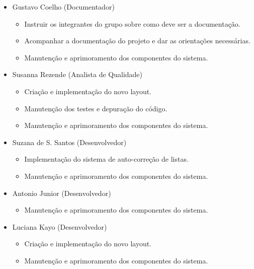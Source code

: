 \documentclass[12pt,letterpaper]{article}
\begin{document}
\begin{itemize}
\item {}Gustavo Coelho (Documentador)\\
\vspace{-0.5cm}
\begin{itemize}
\item{}Instruir os integrantes do grupo sobre como deve ser a documentação.\\
\item{}Acompanhar a documentação do projeto e dar as orientações necessárias.\\
\item{}Manutenção e aprimoramento dos componentes do sistema.
\end{itemize}
\vspace{0.5cm}

\item {}Susanna Rezende (Analista de Qualidade)\\
\vspace{-0.5cm}
\begin{itemize}
\item{}Criação e implementação do novo layout.\\
\item{}Manutenção dos testes e depuração do código.\\
\item{}Manutenção e aprimoramento dos componentes do sistema.
\end{itemize}
\vspace{0.5cm}

\item {}Suzana de S. Santos (Desenvolvedor)\\
\vspace{-0.5cm}
\begin{itemize}
\item{}Implementação do sistema de auto-correção de listas.\\
\item{}Manutenção e aprimoramento dos componentes do sistema.
\end{itemize}
\vspace{0.5cm}

\item {}Antonio Junior (Desenvolvedor)\\
\vspace{-0.5cm}
\begin{itemize}
\item{}Manutenção e aprimoramento dos componentes do sistema.
\end{itemize}
\vspace{0.5cm}

\item {}Luciana Kayo (Desenvolvedor)\\
\vspace{-0.5cm}
\begin{itemize}
\item{}Criação e implementação do novo layout.\\
\item{}Manutenção e aprimoramento dos componentes do sistema.
\end{itemize}

\end{itemize}
\end{document}
